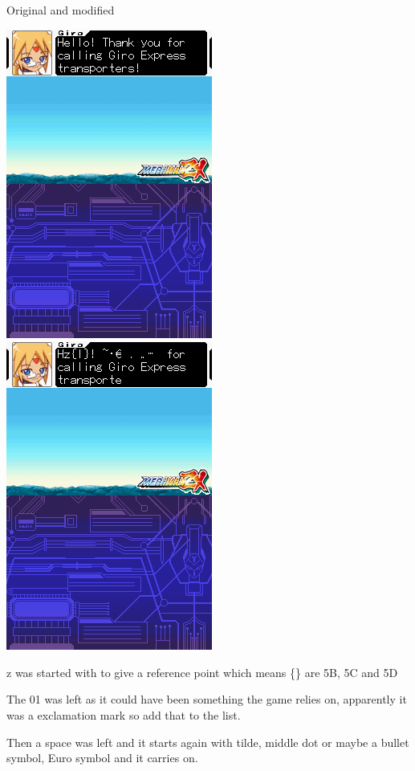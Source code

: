 \documentclass[
]{book}
\begin{document}
Original and modified

\includegraphics{images/91_home_fast6191_romhackingguide_unrenamed_file___nal_borders_romhackingguidertextalteration1.png}\includegraphics{images/92_home_fast6191_romhackingguide_unrenamed_file___nal_borders_romhackingguidertextalteration4.png}

z was started with to give a reference point which means \{\textbar\} are 5B, 5C and 5D

The 01 was left as it could have been something the game relies on, apparently it was a exclamation mark so add that to the list.

Then a space was left and it starts again with tilde, middle dot or maybe a bullet symbol, Euro symbol and it carries on.
\end{document}
